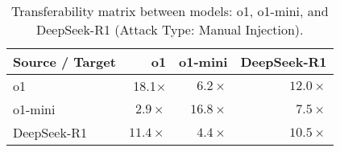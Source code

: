 
\begin{table}[t]


\vskip 0.15in
\begin{center}
\begin{small}
\begin{sc}
\begin{tabular}{lrrr}
  \toprule
  Source / Target & o1 & o1-mini & DeepSeek-R1 \\
  \midrule
  o1        & 18.1$\times$ & $6.2\times$ & $12.0\times$  \\
  o1-mini   & $2.9\times$  & $16.8\times$ & $7.5\times$ \\
  DeepSeek-R1  & $11.4\times$  & $4.4\times$  & $10.5\times$ \\
  \bottomrule
\end{tabular}
\end{sc}
\end{small}
\end{center}
\vskip -0.1in
\caption{Transferability matrix between models: o1, o1-mini, and DeepSeek-R1 (Attack Type: Manual Injection).}
\label{tab:transferability}
\end{table}
